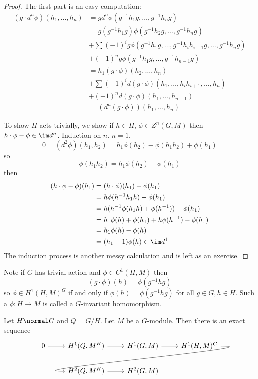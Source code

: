 \documentclass[a4paper]{article}
\begin{document}
\begin{proof}
  The first part is an easy computation:
  \begin{align*}
    (g \cdot d^n \phi)(h_1, \dots, h_n)
    &= g d^n\phi(g^{-1}h_1g, \dots, g^{-1}h_ng) \\
    &= g(g^{-1}h_1g) \phi(g^{-1}h_2g, \dots, g^{-1}h_ng) \\
    &+ \sum (-1)^i g \phi(g^{-1}h_1g, \dots, g^{-1} h_ih_{i + 1} g, \dots, g^{-1} h_n g) \\
    &+ (-1)^n g \phi(g^{-1}h_1g, \dots, g^{-1}h_{n - 1}g) \\
    &= h_1 (g \cdot \phi)(h_2, \dots, h_n) \\
    &+ \sum (-1)^i d (g \cdot \phi) (h_1, \dots, h_i h_{i + 1}, \dots, h_n) \\
    &+ (-1)^n d(g \cdot \phi) (h_1, \dots, h_{n - 1}) \\
    &= (d^n(g \cdot \phi))(h_1, \dots, h_n)
  \end{align*}
  
  To show \(H\) acts trivially, we show if \(h \in H\), \(\phi \in Z^n(G, M)\) then \(h \cdot \phi - \phi \in \im d^n\). Induction on \(n\). \(n = 1\),
  \[
    0 = (d^2 \phi)(h_1, h_2) = h_1\phi(h_2) - \phi(h_1h_2) + \phi(h_1)
  \]
  so
  \[
    \phi(h_1h_2) = h_1\phi(h_2) + \phi(h_1)
  \]
  then
  \begin{align*}
    (h \cdot \phi - \phi)(h_1)
    &= (h \cdot \phi)(h_1) - \phi(h_1) \\
    &= h \phi(h^{-1}h_1h) - \phi(h_1) \\
    &= h(h^{-1} \phi(h_1h) + \phi(h^{-1})) - \phi(h_1) \\
    &= h_1\phi(h) + \phi(h_1) + h\phi(h^{-1}) - \phi(h_1) \\
    &= h_1\phi(h) - \phi(h) \\
    &= (h_1 - 1) \phi(h) \in \im d^1
  \end{align*}
  The induction process is another messy calculation and is left as an exercise.
\end{proof}

Note if \(G\) has trivial action and \(\phi \in C^1(H, M)\) then
\[
  (g \cdot \phi)(h) = \phi(g^{-1}hg)
\]
so \(\phi \in H^1(H, M)^G\) if and only if \(\phi(h) = \phi(g^{-1}hg)\) for all \(g \in G, h \in H\). Such a \(\phi: H \to M\) is called a \(G\)-invariant homomorphism.

\begin{theorem}
  Let \(H \normal G\) and \(Q = G/H\). Let \(M\) be a \(G\)-module. Then there is an exact sequence
  \[
    \begin{tikzcd}
      0 \ar[r] & H^1(Q, M^H) \ar[r] & H^1(G, M) \ar[r] & H^1(H, M)^G \ar[dll, out=0, in=180, overlay] \\
      & H^2(Q, M^H) \ar[r] & H^2(G, M)
    \end{tikzcd}
  \]
\end{theorem}
\end{document}
